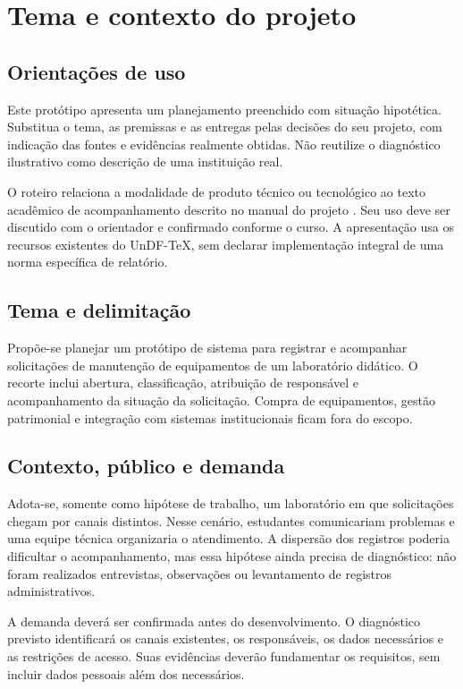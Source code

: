 \chapter{Tema e contexto do projeto}

\section{Orientações de uso}

Este protótipo apresenta um planejamento preenchido com situação hipotética.
Substitua o tema, as premissas e as entregas pelas decisões do seu projeto,
com indicação das fontes e evidências realmente obtidas. Não reutilize o
diagnóstico ilustrativo como descrição de uma instituição real.

O roteiro relaciona a modalidade de produto técnico ou tecnológico ao texto
acadêmico de acompanhamento descrito no manual do projeto
. Seu uso deve ser discutido com o orientador e confirmado
conforme o curso. A apresentação usa os recursos existentes do UnDF-TeX, sem
declarar implementação integral de uma norma específica de relatório.

\section{Tema e delimitação}

Propõe-se planejar um protótipo de sistema para registrar e acompanhar
solicitações de manutenção de equipamentos de um laboratório didático.
O recorte inclui abertura, classificação, atribuição de responsável e
acompanhamento da situação da solicitação. Compra de equipamentos, gestão
patrimonial e integração com sistemas institucionais ficam fora do escopo.

\section{Contexto, público e demanda}

Adota-se, somente como hipótese de trabalho, um laboratório em que solicitações
chegam por canais distintos. Nesse cenário, estudantes comunicariam problemas
e uma equipe técnica organizaria o atendimento. A dispersão dos registros
poderia dificultar o acompanhamento, mas essa hipótese ainda precisa de
diagnóstico: não foram realizados entrevistas, observações ou levantamento
de registros administrativos.

A demanda deverá ser confirmada antes do desenvolvimento. O diagnóstico
previsto identificará os canais existentes, os responsáveis, os dados
necessários e as restrições de acesso. Suas evidências deverão fundamentar
os requisitos, sem incluir dados pessoais além dos necessários.

